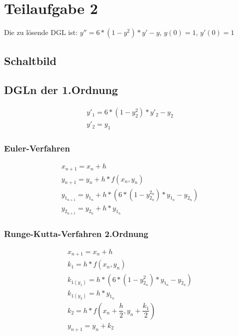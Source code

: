 \documentclass[]{scrartcl}
\begin{document}
\section{Teilaufgabe 2}
Die zu lösende DGL ist:
$ y'' = 6 * (1 - y^{2}) * y' - y $,
$ y(0) = 1 $,
$ y'(0) = 1 $

\subsection{Schaltbild}

\subsection{DGLn der 1.Ordnung}
\begin{align}
y'_{1} = 6 * (1 - y_{2}^{2}) * y'_{2} - y_{2} \\
y'_{2} = y_{1}
\end{align}

\subsubsection{Euler-Verfahren}
\begin{align}
x_{n+1} = x_{n}+h \\
y_{n+1} = y_{n}+h*f(x_{n},y_{n}) \\
y_{1_{n+1}} = y_{1_{n}}+h*(6 * (1 - y_{2_{n}}^{2_{n}}) * y_{1_{n}} - y_{2_{n}}) \\
y_{2_{n+1}} = y_{2_{n}} + h * y_{1_{n}}
\end{align}

\subsubsection{Runge-Kutta-Verfahren 2.Ordnung}
\begin{align}
x_{n+1} = x_{n}+h \\
k_{1} = h*f(x_{n},y_{n}) \\
k_{1(y_{1})} = h * (6 * (1 - y_{2_{n}}^{2}) * y_{1_{n}} - y_{2_{n}}) \\
k_{1(y_{2})} = h * y_{1_{n}} \\
k_{2} = h*f(x_{n} + \dfrac{h}{2},y_{n} + \dfrac{k_{1}}{2}) \\
y_{n+1} = y_{n}+k_{2}
\end{align}
\end{document}
